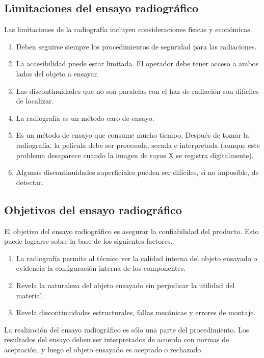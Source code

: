 \subsection{Limitaciones del ensayo radiográfico}
Las limitaciones de la radiografía \cite{wiki:Radiografia} incluyen consideraciones físicas y económicas.

\begin{enumerate}
\item Deben seguirse siempre los procedimientos de seguridad para las radiaciones.
\item La accesibilidad puede estar limitada. El operador debe tener acceso a ambos lados del objeto a ensayar.
\item Las discontinuidades que no son paralelas con el haz de radiación son difíciles de localizar.
\item La radiografía es un método caro de ensayo.
\item Es un método de ensayo que consume mucho tiempo. Después de tomar la radiografía, la película debe ser procesada, secada e interpretada (aunque este problema desaparece cuando la imagen de rayos X se registra digitalmente).
\item Algunas discontinuidades superficiales pueden ser difíciles, si no imposible, de detectar.
\end{enumerate}

\subsection{Objetivos del ensayo radiográfico}
El objetivo del ensayo radiográfico \cite{wiki:Radiografia} es asegurar la confiabilidad del producto. Esto puede lograrse sobre la base de los siguientes factores.

\begin{enumerate}
\item La radiografía permite al técnico ver la calidad interna del objeto ensayado o evidencia la
configuración interna de los componentes.
\item Revela la naturaleza del objeto ensayado sin perjudicar la utilidad del material.
\item Revela discontinuidades estructurales, fallas mecánicas y errores de montaje.
\end{enumerate}

La realización del ensayo radiográfico es sólo una parte del procedimiento. Los resultados del ensayo deben ser interpretados de acuerdo con normas de aceptación, y luego el objeto ensayado es aceptado o rechazado.

